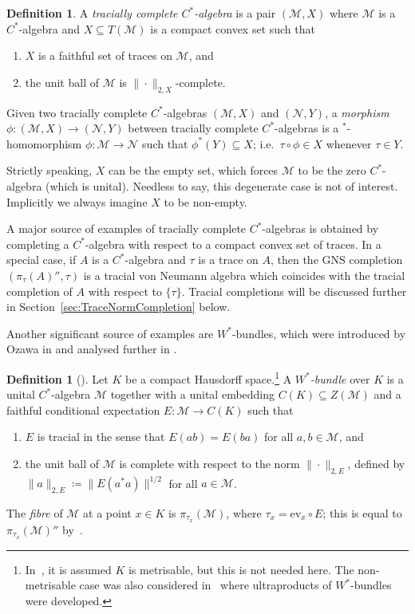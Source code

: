 \documentclass[a4paper,11pt]{amsart}
\theoremstyle{definition}
\newtheorem{definition}[theorem]{Definition}
\numberwithin{equation}{section}
\numberwithin{theorem}{section}
\newcommand{\M}{\mathcal{M}}
\begin{document}
\begin{definition}\label{def:TC}
	A \emph{tracially complete $C^*$-algebra} is a pair $(\M,X)$ where $\M$ is a $C^*$-algebra and $X \subseteq T(\M)$ is a compact convex set such that
	\begin{enumerate}
		\item $X$ is a faithful set of traces on $\M$, and
		\item the unit ball of $\M$ is $\|\cdot\|_{2,X}$-complete.
	\end{enumerate}
	Given two tracially complete $C^*$-algebras $(\M,X)$ and $(\mathcal N,Y)$, a \emph{morphism} $\phi\colon (\M,X) \rightarrow (\mathcal N,Y)$ between tracially complete $C^*$-algebras is a  $^*$-ho\-mo\-mor\-phism $\phi\colon \M \to \mathcal N$ such that $\phi^*(Y)\subseteq X$; i.e.\ $\tau\circ\phi\in X$ whenever $\tau\in Y$.
\end{definition}

Strictly speaking, $X$ can be the empty set, which forces $\M$ to be the zero $C^*$-algebra (which is unital).  Needless to say, this degenerate case is not of interest. Implicitly we always imagine $X$ to be non-empty.


A major source of examples of tracially complete $C^*$-algebras is obtained by completing a $C^*$-algebra with respect to a compact convex set of traces. 
In a special case, if $A$ is a $C^*$-algebra and $\tau$ is a trace on $A$, then the GNS completion $(\pi_\tau(A)'', \tau)$ is a tracial von Neumann algebra which coincides with the tracial completion of $A$ with respect to $\{\tau\}$.
Tracial completions will be discussed further in Section~\ref{sec:TraceNormCompletion} below.

Another significant source of examples are $W^*$-bundles, which were introduced by Ozawa in \cite{Oz13} and analysed further in \cite{Ev16,Ev18}.

\begin{definition}[{\cite[Section 5]{Oz13}}]
	\label{defn:W*bundle}
	Let $K$ be a compact Hausdorff space.\footnote{In~\cite{Oz13}, it is assumed $K$ is metrisable, but this is not needed here.  The non-metrisable case was also considered in~\cite{BBSTWW} where ultraproducts of $W^*$-bundles were developed.}  A \emph{$W^*$-bundle} over $K$ is a unital $C^*$-algebra $\M$ together with a unital embedding $C(K) \subseteq Z(\M)$ and a faithful conditional expectation $E\colon\M \to C(K)$ such that
	\begin{enumerate}
		\item $E$ is tracial in the sense that $E(ab) = E(ba)$ for all $a,b \in \M$, and
		\item the unit ball of $\M$ is complete with respect to the norm $\|\cdot\|_{2,E}$, defined by $\|a\|_{2,E}\coloneqq\|E(a^*a)\|^{1/2}$ for all $a \in \mathcal M$.
	\end{enumerate}
	The \emph{fibre} of $\M$ at a point $x \in K$ is $\pi_{\tau_x}(\M)$, where $\tau_x=\mathrm{ev}_x \circ E$; this is equal to $\pi_{\tau_x}(\M)''$ by~\cite[Theorem 11]{Oz13}.
\end{definition}
\end{document}
